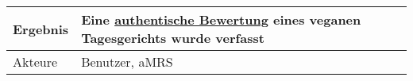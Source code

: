 \begin{table}[H]
\begin{tabularx}{\textwidth}{| l | X |}
        \hline
        Ergebnis           & Eine \hyperref[gls:authentischeBewertung]{authentische Bewertung} eines veganen Tagesgerichts wurde verfasst                                                                                                                                                                                                                                                                                                                                                                                                                                                                                                        \\
        \hline
        Akteure            & Benutzer, \ac{aMRS}                                                                                                                                                                                                                                                                                                                                                                                                                                                                                                                                                                                                 \\
        \hline
    \end{tabularx}
\end{table}



